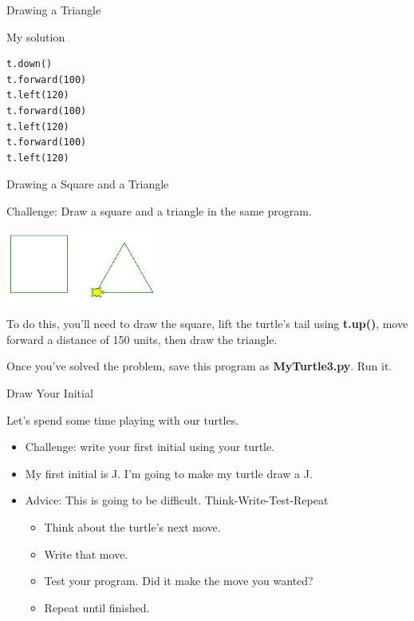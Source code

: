 \documentclass{beamer}
\begin{document}
\begin{frame}[fragile]{Drawing a Triangle}

My solution

\begin{verbatim}
t.down()
t.forward(100)
t.left(120)
t.forward(100)
t.left(120)
t.forward(100)
t.left(120)
\end{verbatim}
\end{frame}

\begin{frame}{Drawing a Square and a Triangle}

Challenge: Draw a square and a triangle in the same program.

\includegraphics[width=50mm]{images/turtleSquareTriangle.png}

To do this, you'll need to draw the square, lift the turtle's tail using \textbf{t.up()}, move forward a distance of 150 units, then draw the triangle.

Once you've solved the problem, save this program as \textbf{MyTurtle3.py}. Run it.
\end{frame}

\begin{frame}{Draw Your Initial}

Let's spend some time playing with our turtles.

\begin{itemize}
\item Challenge: write your first initial using your turtle.
\item My first initial is J. I'm going to make my turtle draw a J.
\item Advice: This is going to be difficult. Think-Write-Test-Repeat
\begin{itemize}
\item Think about the turtle's next move.
\item Write that move.
\item Test your program. Did it make the move you wanted?
\item Repeat until finished.
\end{itemize}
\end{itemize}

\end{frame}
\end{document}
